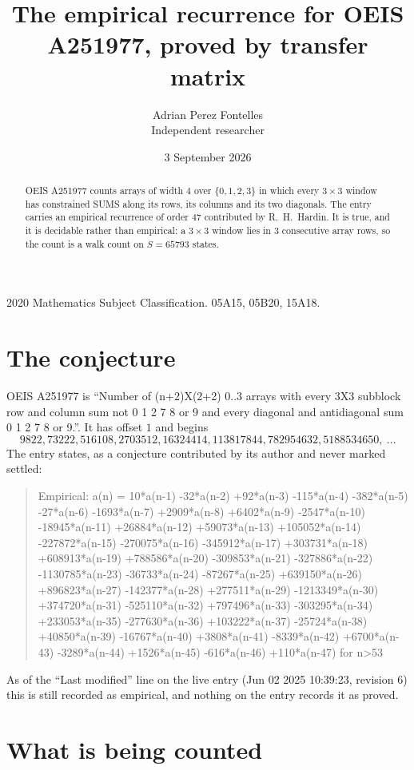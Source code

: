 \documentclass[11pt,a4paper]{article}
\title{The empirical recurrence for OEIS A251977, proved by transfer matrix}
\author{Adrian Perez Fontelles\\ \small Independent researcher}
\date{3 September 2026}
\theoremstyle{plain}
\theoremstyle{definition}
\begin{document}
\maketitle

\begin{abstract}
OEIS A251977 counts arrays of width $4$ over $\{0,1,2,3\}$ in which every $3\times3$ window has
constrained SUMS along its rows, its columns and its two diagonals. The entry carries an
empirical recurrence of order $47$ contributed by R.~H.~Hardin. It is true, and it is
decidable rather than empirical: a $3\times3$ window lies in $3$ consecutive array rows,
so the count is a walk count on $S=65793$ states.
\end{abstract}

\noindent\small 2020 Mathematics Subject Classification. 05A15, 05B20, 15A18.\normalsize

\section{The conjecture}

OEIS A251977 is ``Number of (n+2)X(2+2) 0..3 arrays with every 3X3 subblock row and column sum not 0 1 2 7 8 or 9 and every diagonal and antidiagonal sum 0 1 2 7 8 or 9.''. It has offset $1$ and begins
\[
9822, 73222, 516108, 2703512, 16324414, 113817844, 782954632, 5188534650,\ \dots
\]
The entry states, as a conjecture contributed by its author and never marked settled:
\begin{quote}
Empirical: a(n) = 10*a(n-1) -32*a(n-2) +92*a(n-3) -115*a(n-4) -382*a(n-5) -27*a(n-6) -1693*a(n-7) +2909*a(n-8) +6402*a(n-9) -2547*a(n-10) -18945*a(n-11) +26884*a(n-12) +59073*a(n-13) +105052*a(n-14) -227872*a(n-15) -270075*a(n-16) -345912*a(n-17) +303731*a(n-18) +608913*a(n-19) +788586*a(n-20) -309853*a(n-21) -327886*a(n-22) -1130785*a(n-23) -36733*a(n-24) -87267*a(n-25) +639150*a(n-26) +896823*a(n-27) -142377*a(n-28) +277511*a(n-29) -1213349*a(n-30) +374720*a(n-31) -525110*a(n-32) +797496*a(n-33) -303295*a(n-34) +233053*a(n-35) -277630*a(n-36) +103222*a(n-37) -25724*a(n-38) +40850*a(n-39) -16767*a(n-40) +3808*a(n-41) -8339*a(n-42) +6700*a(n-43) -3289*a(n-44) +1526*a(n-45) -616*a(n-46) +110*a(n-47) for n>53
\end{quote}
As of the ``Last modified'' line on the live entry (Jun 02 2025 10:39:23, revision 6) this is still
recorded as empirical, and nothing on the entry records it as proved.

\section{What is being counted}
\end{document}
